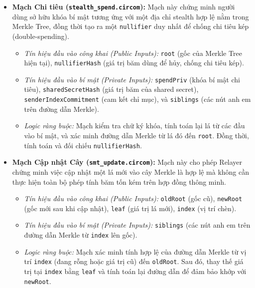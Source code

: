 \documentclass[../DoAn.tex]{subfiles}
\begin{document}
\begin{itemize}
    \item \textbf{Mạch Chi tiêu (\texttt{stealth\_spend.circom}):} 
    Mạch này chứng minh người dùng sở hữu khóa bí mật tương ứng với một địa chỉ stealth hợp lệ nằm trong Merkle Tree, đồng thời tạo ra một \texttt{nullifier} duy nhất để chống chi tiêu kép (double-spending).
    \begin{itemize}
        \item \textit{Tín hiệu đầu vào công khai (Public Inputs):} \texttt{root} (gốc của Merkle Tree hiện tại), \texttt{nullifierHash} (giá trị băm dùng để hủy, chống chi tiêu kép).
        \item \textit{Tín hiệu đầu vào bí mật (Private Inputs):} \texttt{spendPriv} (khóa bí mật chi tiêu), \texttt{sharedSecretHash} (giá trị băm của shared secret), \texttt{senderIndexCommitment} (cam kết chỉ mục), và \texttt{siblings} (các nút anh em trên đường dẫn Merkle).
        \item \textit{Logic ràng buộc:} Mạch kiểm tra chữ ký khóa, tính toán lại lá từ các đầu vào bí mật, và xác minh đường dẫn Merkle từ lá đó đến \texttt{root}. Đồng thời, tính toán và đối chiếu \texttt{nullifierHash}.
    \end{itemize}

    \item \textbf{Mạch Cập nhật Cây (\texttt{smt\_update.circom}):}
    Mạch này cho phép Relayer chứng minh việc cập nhật một lá mới vào cây Merkle là hợp lệ mà không cần thực hiện toàn bộ phép tính băm tốn kém trên hợp đồng thông minh.
    \begin{itemize}
        \item \textit{Tín hiệu đầu vào công khai (Public Inputs):} \texttt{oldRoot} (gốc cũ), \texttt{newRoot} (gốc mới sau khi cập nhật), \texttt{leaf} (giá trị lá mới), \texttt{index} (vị trí chèn).
        \item \textit{Tín hiệu đầu vào bí mật (Private Inputs):} \texttt{siblings} (các nút anh em trên đường dẫn Merkle từ \texttt{index} lên gốc).
        \item \textit{Logic ràng buộc:} Mạch xác minh tính hợp lệ của đường dẫn Merkle từ vị trí \texttt{index} (đang rỗng hoặc giá trị cũ) đến \texttt{oldRoot}. Sau đó, thay thế giá trị tại \texttt{index} bằng \texttt{leaf} và tính toán lại đường dẫn để đảm bảo khớp với \texttt{newRoot}.
    \end{itemize}
\end{itemize}

\end{document}
